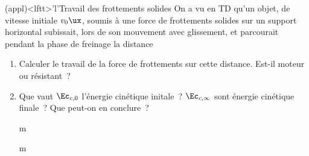 \documentclass[../../main/main.tex]{subfiles}
\begin{document}
\begin{tcb*}(appl)<lftt>'l'{Travail des frottements solides}
	On a vu en TD qu'un objet, de vitesse initiale $v_0\ux$, soumis à une force
	de frottements solides sur un support horizontal subissait, lors de son
	mouvement avec glissement,
	\psw{%
		\[\Tf = -fmg\ux\]
	}%
	et parcourait pendant la phase de freinage la distance
	\psw{%
	\[D = \frac{v_0{}^2}{2fg}\]
	}%
	\begin{enumerate}[label=\sqenumi]
		\item Calculer le travail de la force de frottements sur cette distance.
		      Est-il moteur ou résistant~?
		\item Que vaut $\Ec_{c,0}$ l'énergie cinétique initale~? $\Ec_{c,\infty}$
		      sont énergie cinétique finale~? Que peut-on en conclure~?
	\end{enumerate}
	\tcblower
	\begin{enumerate}[label=\sqenumi]
		\item[m] %
		\item[m] %
	\end{enumerate}
\end{tcb*}
\end{document}

